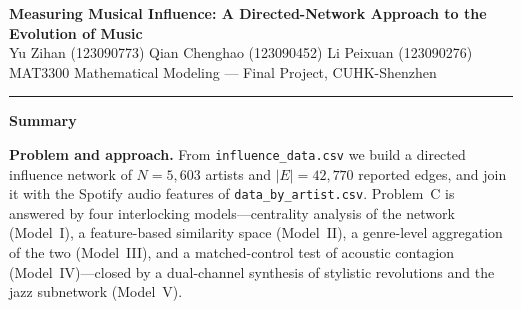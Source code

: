 \documentclass[11pt,letterpaper]{article}
\numberwithin{equation}{section}
\newcommand{\TeamMembers}{%
  Yu Zihan (123090773)\quad
  Qian Chenghao (123090452)\quad
  Li Peixuan (123090276)}
\begin{document}

\thispagestyle{empty}
\begin{center}
  {\LARGE\bfseries Measuring Musical Influence: A Directed-Network Approach
   to the Evolution of Music}\\[10pt]
  {\normalsize \TeamMembers}\\[4pt]
  {\small MAT3300 Mathematical Modeling --- Final Project, CUHK-Shenzhen}
\end{center}
\vspace{0.8em}
\noindent\rule{\textwidth}{0.6pt}
\vspace{0.8em}
\begin{center}
  {\Large\bfseries Summary}
\end{center}
\noindent\textbf{Problem and approach.} From \texttt{influence\_data.csv}
we build a directed influence network of $N=5{,}603$ artists and
$|E|=42{,}770$ reported edges, and join it with the Spotify audio features
of \texttt{data\_by\_artist.csv}. Problem~C is answered by four
interlocking models---centrality analysis of the network (Model~I), a
feature-based similarity space (Model~II), a genre-level aggregation of
the two (Model~III), and a matched-control test of acoustic contagion
(Model~IV)---closed by a dual-channel synthesis of stylistic revolutions
and the jazz subnetwork (Model~V).
\end{document}
